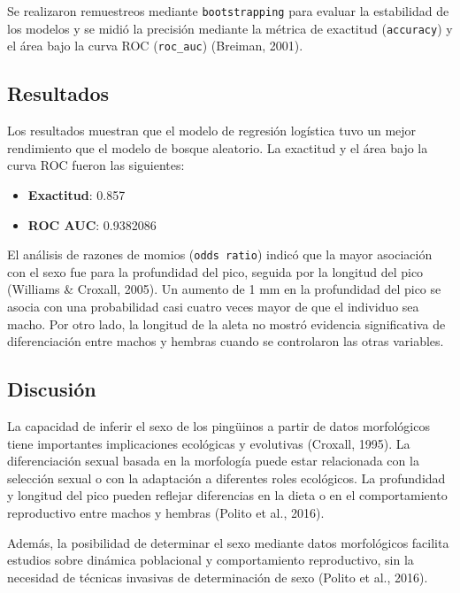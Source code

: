 \documentclass[
]{agujournal2019}
\providecommand{\tightlist}{%
  \setlength{\itemsep}{0pt}\setlength{\parskip}{0pt}}\usepackage{longtable,booktabs,array}
\begin{document}
Se realizaron remuestreos mediante \texttt{bootstrapping} para evaluar
la estabilidad de los modelos y se midió la precisión mediante la
métrica de exactitud (\texttt{accuracy}) y el área bajo la curva ROC
(\texttt{roc\_auc}) (Breiman, 2001).

\subsection{Resultados}\label{resultados}

Los resultados muestran que el modelo de regresión logística tuvo un
mejor rendimiento que el modelo de bosque aleatorio. La exactitud y el
área bajo la curva ROC fueron las siguientes:

\begin{itemize}
\tightlist
\item
  \textbf{Exactitud}: 0.857\\
\item
  \textbf{ROC AUC}: 0.9382086
\end{itemize}

El análisis de razones de momios (\texttt{odds\ ratio}) indicó que la
mayor asociación con el sexo fue para la profundidad del pico, seguida
por la longitud del pico (Williams \& Croxall, 2005). Un aumento de 1 mm
en la profundidad del pico se asocia con una probabilidad casi cuatro
veces mayor de que el individuo sea macho. Por otro lado, la longitud de
la aleta no mostró evidencia significativa de diferenciación entre
machos y hembras cuando se controlaron las otras variables.

\subsection{Discusión}\label{discusiuxf3n}

La capacidad de inferir el sexo de los pingüinos a partir de datos
morfológicos tiene importantes implicaciones ecológicas y evolutivas
(Croxall, 1995). La diferenciación sexual basada en la morfología puede
estar relacionada con la selección sexual o con la adaptación a
diferentes roles ecológicos. La profundidad y longitud del pico pueden
reflejar diferencias en la dieta o en el comportamiento reproductivo
entre machos y hembras (Polito et al., 2016).

Además, la posibilidad de determinar el sexo mediante datos morfológicos
facilita estudios sobre dinámica poblacional y comportamiento
reproductivo, sin la necesidad de técnicas invasivas de determinación de
sexo (Polito et al., 2016).
\end{document}
